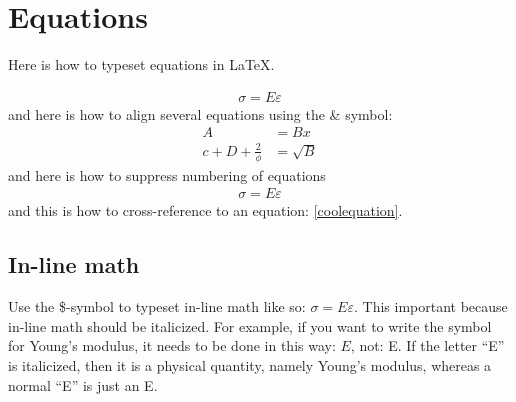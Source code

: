 \section{Equations}
Here is how to typeset equations in \LaTeX{}.

\begin{align}
\sigma = E\varepsilon \label{coolequation}
\end{align}
and here is how to align several equations using the \& symbol:
\begin{align}
A &= Bx \\ %
c + D +\frac{2}{\phi} &= \sqrt{B}
\end{align}
and here is how to suppress numbering of equations
\begin{align*}
\sigma = E\varepsilon
\end{align*}
and this is how to cross-reference to an equation: \cref{coolequation}.

\subsection{In-line math}
Use the \$-symbol to typeset in-line math like so: $\sigma = E\varepsilon$. This important because in-line math should be italicized. For example, if you want to write the symbol for Young's modulus, it needs to be done in this way: $E$, not: E. If the letter ``E'' is italicized, then it is a physical quantity, namely Young's modulus, whereas a normal ``E'' is just an E.